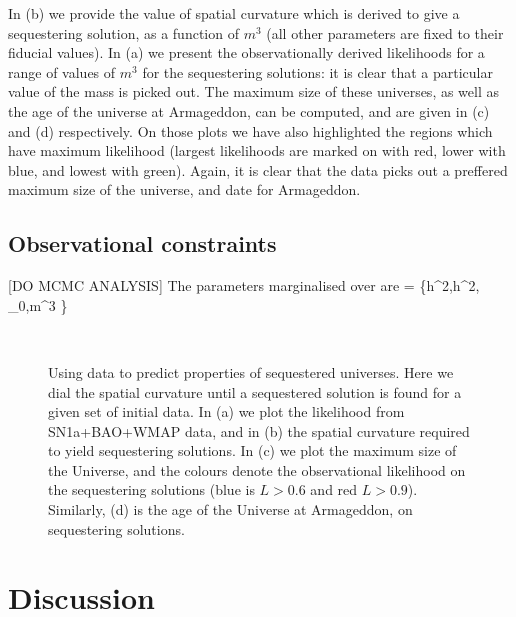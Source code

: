 \documentclass[amsmath,amssymb,10pt,twocolumn,eqsecnum]{revtex4}
\newcommand{\comment}[1]{{\color{red}[#1]}}
\begin{document}
In (b) we provide the value of spatial curvature which is derived to give a sequestering solution, as a function of $m^3$ (all other parameters are fixed to their fiducial values). In (a) we present the observationally derived likelihoods for a range of values of $m^3$ for the sequestering solutions: it is clear that a particular value of the mass is picked out. The maximum size of these universes, as well as the age of the universe at Armageddon, can be computed, and are given in (c) and (d) respectively. On those plots we have also highlighted the regions which have maximum likelihood (largest likelihoods are marked on with red, lower with blue, and lowest with green). Again, it is clear that the data picks out a preffered maximum size of the universe, and date for Armageddon.

\subsection{Observational constraints}
\comment{DO MCMC ANALYSIS}
The parameters marginalised over are
\bea
{} = \bigg\{h^2,h^2, \dot{\phi}_0,m^3 \bigg\}
\eea

 \begin{figure}[!t]
      \begin{center}
      	 \qquad
	\\
	 \qquad
      \end{center}
\caption{Using data to predict properties of sequestered universes. Here we dial the spatial curvature until a sequestered solution is found for a given set of initial data. In (a) we plot the likelihood from SN1a+BAO+WMAP data, and in (b) the spatial curvature required to yield sequestering solutions. In (c) we plot the maximum size of the Universe, and the colours denote the observational likelihood on the sequestering solutions (blue is $L > 0.6$ and red $L > 0.9$). Similarly, (d) is the age of the Universe at Armageddon, on sequestering solutions. }\label{likelihood_sequestering_sweep}
\end{figure}

\section{Discussion} 



\end{document}
